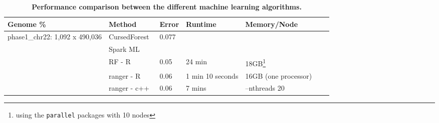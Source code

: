 \documentclass[11pt]{article}
\newcommand{\cursedforest}{{\sc CursedForest}}
\begin{document}
\begin{table}[!ht]
\begin{minipage}{\textwidth}
\centering
\caption{
{\bf Performance comparison between the different machine learning algorithms.}}
\begin{tabular}{|l|l|l|l|l|l|p{1cm}|}
\hline
\bf{Genome \%}                      & \bf{Method} & \bf{Error}  & \bf{Runtime} & \bf{Memory/Node} \\
\hline

\multirow{3}{*}{phase1\_chr22: 1,092 x 490,036} & \cursedforest\ & 0.077  &                  &                                                                   \\
                                                & Spark ML  &            &                  &                                                                   \\
                                                & RF - R         & 0.05       & 24 min           & 18GB\footnote{using the \texttt{parallel} packages with 10 nodes} \\
                                                & ranger - R      & 0.06       & 1 min 10 seconds & 16GB  (one processor)                                             \\
                                                & ranger - c++     & 0.06       & 7 mins           & --nthreads 20                                                     \\


\end{tabular}
\end{minipage}
\end{table}
\end{document}
